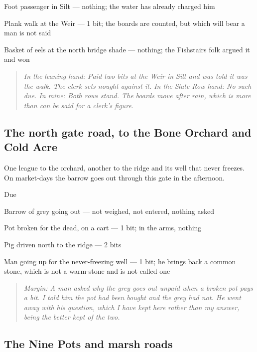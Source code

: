 \documentclass{design/chronicle}
\begin{document}
Foot passenger in Silt — nothing; the water has already charged him\par

Plank walk at the Weir — 1 bit; the boards are counted, but which will bear a man is not said\par

Basket of eels at the north bridge shade — nothing; the Fishstairs folk argued it and won\par

\begin{quote}\itshape \emph{In the leaning hand:} Paid two bits at the Weir in Silt and was told it was the walk. The clerk sets nought against it. \emph{In the Slate Row hand:} No such due. \emph{In mine:} Both rows stand. The boards move after rain, which is more than can be said for a clerk’s figure.\end{quote}

\subsection*{The north gate road, to the Bone Orchard and Cold Acre}

One league to the orchard, another to the ridge and its well that never freezes. On market-days the barrow goes out through this gate in the afternoon.

Due\par

Barrow of grey going out — not weighed, not entered, nothing asked\par

Pot broken for the dead, on a cart — 1 bit; in the arms, nothing\par

Pig driven north to the ridge — 2 bits\par

Man going up for the never-freezing well — 1 bit; he brings back a common stone, which is not a warm-stone and is not called one\par

\begin{quote}\itshape \emph{Margin:} A man asked why the grey goes out unpaid when a broken pot pays a bit. I told him the pot had been bought and the grey had not. He went away with his question, which I have kept here rather than my answer, being the better kept of the two.\end{quote}

\subsection*{The Nine Pots and marsh roads}
\end{document}
